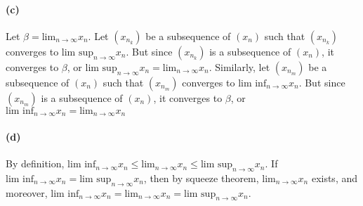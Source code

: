 \documentclass[10pt,letter]{article}
\begin{document}
\paragraph{(c)} Let $\beta=\text{lim}_{n\rightarrow\infty}x_n$. Let $(x_{n_k})$ be a subsequence of $(x_n)$ such that $(x_{n_k})$ converges to $\text{lim sup}_{n\rightarrow\infty}x_n$. But since $(x_{n_k})$ is a subsequence of $(x_n)$, it converges to $\beta$, or $\text{lim sup}_{n\rightarrow\infty}x_n=\text{lim}_{n\rightarrow\infty}x_n$. Similarly, let $(x_{n_m})$ be a subsequence of $(x_n)$ such that $(x_{n_m})$ converges to $\text{lim inf}_{n\rightarrow\infty}x_n$. But since $(x_{n_m})$ is a subsequence of $(x_n)$, it converges to $\beta$, or $\text{lim inf}_{n\rightarrow\infty}x_n=\text{lim}_{n\rightarrow\infty}x_n$

\paragraph{(d)} By definition, $\text{lim inf}_{n\rightarrow\infty}x_n\leq\text{lim}_{n\rightarrow\infty}x_n\leq\text{lim sup}_{n\rightarrow\infty}x_n$. If $\text{lim inf}_{n\rightarrow\infty}x_n=\text{lim sup}_{n\rightarrow\infty}x_n$, then by squeeze theorem, $\text{lim}_{n\rightarrow\infty}x_n$ exists, and moreover, $\text{lim inf}_{n\rightarrow\infty}x_n=\text{lim}_{n\rightarrow\infty}x_n=\text{lim sup}_{n\rightarrow\infty}x_n$. 
\end{document}
